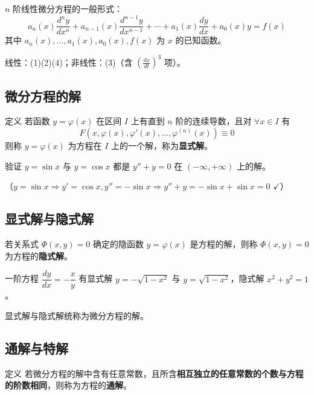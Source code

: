 $n$ 阶线性微分方程的一般形式：
$$a_n(x)\frac{d^n y}{dx^n} + a_{n-1}(x)\frac{d^{n-1} y}{dx^{n-1}} + \cdots + a_1(x)\frac{dy}{dx} + a_0(x)y = f(x)$$
其中 $a_n(x), \ldots, a_1(x), a_0(x), f(x)$ 为 $x$ 的已知函数。

线性：(1)(2)(4)；非线性：(3)（含 $\left(\frac{dx}{dt}\right)^3$ 项）。

\subsection{微分方程的解}

\begin{mydefinition}{定义}
若函数 $y = \varphi(x)$ 在区间 $I$ 上有直到 $n$ 阶的连续导数，且对 $\forall x \in I$ 有
$$F\left(x, \varphi(x), \varphi'(x), \ldots, \varphi^{(n)}(x)\right) \equiv 0$$
则称 $y = \varphi(x)$ 为方程在 $I$ 上的一个解，称为\textbf{显式解}。
\end{mydefinition}

\begin{example}
验证 $y = \sin x$ 与 $y = \cos x$ 都是 $y'' + y = 0$ 在 $(-\infty, +\infty)$ 上的解。

（$y = \sin x \Rightarrow y' = \cos x, y'' = -\sin x \Rightarrow y'' + y = -\sin x + \sin x = 0$ $\checkmark$）
\end{example}

\subsection{显式解与隐式解}

若关系式 $\Phi(x, y) = 0$ 确定的隐函数 $y = \varphi(x)$ 是方程的解，则称 $\Phi(x, y) = 0$ 为方程的\textbf{隐式解}。

\begin{example}
一阶方程 $\dfrac{dy}{dx} = - \dfrac{x}{y}$ 有显式解 $y = -\sqrt{1-x^2}$ 与 $y = \sqrt{1-x^2}$，隐式解 $x^2 + y^2 = 1$。
\end{example}

\begin{remark}
显式解与隐式解统称为微分方程的解。
\end{remark}

\subsection{通解与特解}

\begin{mydefinition}{定义}
若微分方程的解中含有任意常数，且所含\textbf{相互独立的任意常数的个数与方程的阶数相同}，则称为方程的\textbf{通解}。
\end{mydefinition}


